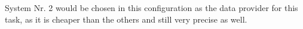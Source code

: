 \documentclass[11pt,a4paper,BCOR12mm, headexclude, footexclude, twoside, openright]{scrartcl}
\numberwithin{equation}{section} %
\numberwithin{figure}{section} %
\numberwithin{table}{section} %
\begin{document}
System Nr. 2 would be chosen in this configuration as the data provider for this task, as it is cheaper than the others and still very precise as well.


\end{document}
